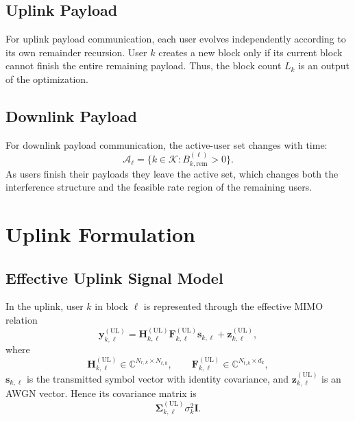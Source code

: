 \documentclass[11pt]{article}
\newcommand{\Kset}{\mathcal{K}}
\newcommand{\Aset}{\mathcal{A}}
\newcommand{\C}{\mathbb{C}}
\newcommand{\I}{\mathbf{I}}
\newcommand{\Hc}{\mathbf{H}}
\newcommand{\F}{\mathbf{F}}
\newcommand{\Sig}{\mathbf{\Sigma}}
\newcommand{\UL}{\mathrm{UL}}
\begin{document}
\subsection{Uplink Payload}

For uplink payload communication, each user evolves independently according to its
own remainder recursion. User $k$ creates a new block only if its current block
cannot finish the entire remaining payload. Thus, the block count
$L_k$ is an output of the optimization.

\subsection{Downlink Payload}

For downlink payload communication, the active-user set changes with time:
\begin{equation}
\Aset_\ell = \{k\in\Kset : B_{k,\mathrm{rem}}^{(\ell)}>0\}.
\label{eq:downlink-payload-active}
\end{equation}
As users finish their payloads they leave the active set, which changes both
the interference structure and the feasible rate region of the remaining users.

\section{Uplink Formulation}

\subsection{Effective Uplink Signal Model}

In the uplink, user $k$ in block $\ell$ is represented through the effective
MIMO relation
\begin{equation}
\mathbf y_{k,\ell}^{(\UL)}
=
\Hc_{k,\ell}^{(\UL)}
\F_{k,\ell}^{(\UL)}
\mathbf s_{k,\ell}
+
\mathbf z_{k,\ell}^{(\UL)},
\label{eq:ul-signal}
\end{equation}
where
\begin{equation}
\Hc_{k,\ell}^{(\UL)} \in \C^{N_{r,k}\times N_{t,k}},
\qquad
\F_{k,\ell}^{(\UL)} \in \C^{N_{t,k}\times d_k},
\label{eq:ul-dimensions}
\end{equation}
$\mathbf s_{k,\ell}$ is the transmitted symbol vector with identity covariance,
and $\mathbf z_{k,\ell}^{(\UL)}$ is an AWGN vector. Hence its covariance matrix
is
\begin{equation}
\Sig_{k,\ell}^{(\UL)}
\sigma_k^2\I.
\label{eq:ul-noise-cov}
\end{equation}
\end{document}
